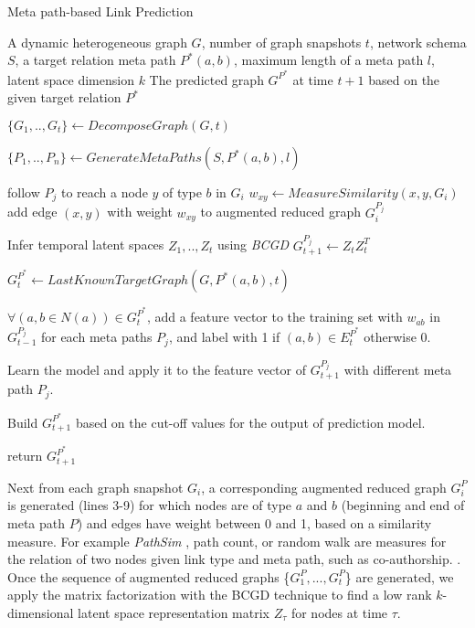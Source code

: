 \begin{algorithm}[t]
\caption{Meta path-based Link Prediction}\label{alg2}
\begin{algorithmic}[1]\scriptsize
\REQUIRE A dynamic heterogeneous graph $G$, number of graph snapshots $t$, network schema $S$, a target relation meta path $P^*(a,b)$, maximum length of a meta path $l$, latent space dimension $k$
\ENSURE The predicted graph $G^{P^*}$ at time $t+1$ based on the given target relation $P^*$

\STATE $\{G_1, .., G_t\} \leftarrow DecomposeGraph(G, t)$

\STATE $\{P_1, .., P_n\} \leftarrow GenerateMetaPaths(S, P^*(a,b), l)$


    
        \STATE follow $P_j$ to reach a node $y$ of type $b$ in $G_i$ 
        \STATE $w_{xy} \leftarrow MeasureSimilarity(x,y, G_i)$
        \STATE add edge $(x,y)$ with weight $w_{xy}$ to augmented reduced graph $G_i^{P_j}$ 
\ENDFOR

\ENDFOR

\STATE Infer temporal latent spaces $Z_1, .., Z_t$ using \textit{BCGD}%
\STATE $G^{P_j}_{t+1} \leftarrow Z_tZ^T_t$ 

\ENDFOR

\STATE $G^{P^*}_{t} \leftarrow LastKnownTargetGraph(G, P^*(a,b), t)$


\STATE $\forall (a,b\in N(a)) \in G^{P^*}_{t}$, add a feature vector to the training set with $w_{ab}$ in $G^{P_j}_{t-1}$ for each meta paths $P_j$, and label with 1 if $(a,b) \in E^{P^*}_{t}$ otherwise 0.

\STATE Learn the model and apply it to the feature vector of $G^{P_j}_{t+1}$ with different meta path $P_j$.

\STATE Build $G^{P^*}_{t+1}$ based on the cut-off values for the output of prediction model.

\STATE return $G^{P^*}_{t+1}$
\end{algorithmic}
\end{algorithm}


 Next from each graph snapshot $G_i$, a corresponding augmented reduced graph $G^P_i$ is generated (lines 3-9) for which nodes are of type $a$ and $b$ (beginning and end of meta path $P$) and edges have weight between 0 and 1, based on a similarity measure. For example \textit{PathSim} \cite{sun2011pathsim}, path count, or random walk are measures for the relation of two nodes given link type and meta path, such as co-authorship.
. Once the sequence of augmented reduced graphs \{$G^P_1, ..., G^P_t$\} are generated, we apply the matrix factorization with the BCGD technique \cite{Zhu2016} to find a low rank $k$-dimensional latent space representation matrix $Z_\tau$ for nodes at time $\tau$.

